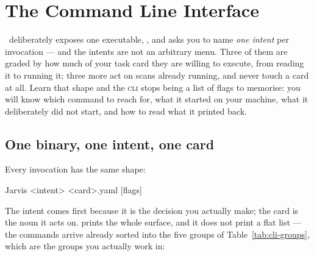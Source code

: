 \chapter{The Command Line Interface}
\label{ch:cli}

 \Jtwo\ deliberately
exposes one executable, , and asks you to name \emph{one intent} per
invocation --- and the intents are not an arbitrary menu. Three of them are graded by how
much of your task card they are willing to execute, from reading it to running it; three
more act on scans already running, and never touch a card at all. Learn that shape and the
\textsc{cli} stops being a list of flags to memorise: you will know which command to reach
for, what it started on your machine, what it deliberately did not start, and how to read
what it printed back.

\section{One binary, one intent, one card}
\label{sec:cli-shape}

Every invocation has the same shape:

\begin{terminal}
\begin{jcmd}
Jarvis <intent> <card>.yaml [flags]
\end{jcmd}
\end{terminal}

The intent comes first because it is the decision you actually make; the card is the
noun it acts on.  prints the whole surface, and it does not print a flat
list --- the commands arrive already sorted into the five groups of
Table~\ref{tab:cli-groups}, which are the groups you actually work in:

